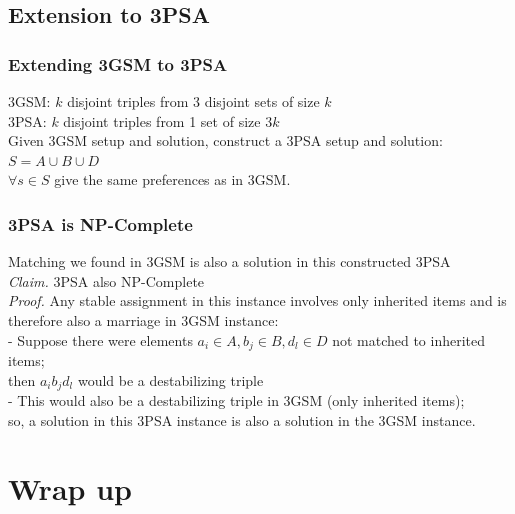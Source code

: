 \documentclass[mathserif,serif]{beamer}
\begin{document}

\subsection{Extension to 3PSA}

\begin{frame}
	\frametitle{Extending 3GSM to 3PSA}
	
	3GSM: $k$ disjoint triples from 3 disjoint sets of size $k$ \\
	3PSA: $k$ disjoint triples from 1 set of size $3k$\\
	\newline
	Given 3GSM setup and solution, construct a 3PSA setup and solution: \\
		$S = A \cup B \cup D$\\
		$\forall s \in S$ give the same preferences as in 3GSM.\\
		
\end{frame}

\begin{frame}
	\frametitle{3PSA is NP-Complete} 
		Matching we found in 3GSM is also a solution in this constructed 3PSA \\
		\newline
		\emph{Claim.} 3PSA also NP-Complete\\
		\emph{Proof.} Any stable assignment in this instance involves only inherited items and is
	therefore also a marriage in 3GSM instance: \\
			- Suppose there were elements $a_i \in A, b_j \in B, d_l \in D$ not matched to inherited items;\\
			then $a_i b_j d_l$ would be a destabilizing triple\\ %
			- This would also be a destabilizing triple in 3GSM (only inherited items);\\
			so, a solution in this 3PSA instance is also a solution in the 3GSM instance. \\
	
\end{frame}

\section{Wrap up}
\end{document}
